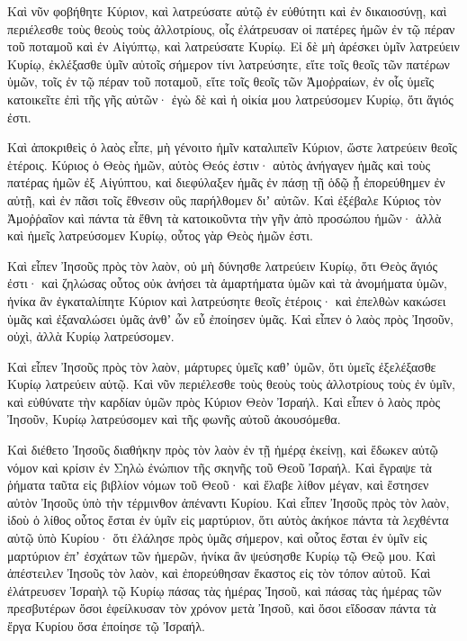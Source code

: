 {\par }{\PP {}Καὶ νῦν φοβήθητε Κύριον, καὶ λατρεύσατε αὐτῷ ἐν εὐθύτητι καὶ ἐν δικαιοσύνῃ, καὶ περιέλεσθε τοὺς θεοὺς τοὺς ἀλλοτρίους, οἷς ἐλάτρευσαν οἱ πατέρες ἡμῶν ἐν τῷ πέραν τοῦ ποταμοῦ καὶ ἐν Αἰγύπτῳ, καὶ λατρεύσατε Κυρίῳ.
Εἰ δὲ μὴ ἀρέσκει ὑμῖν λατρεύειν Κυρίῳ, ἐκλέξασθε ὑμῖν αὐτοῖς σήμερον τίνι λατρεύσητε, εἴτε τοῖς θεοῖς τῶν πατέρων ὑμῶν, τοῖς ἐν τῷ πέραν τοῦ ποταμοῦ, εἴτε τοῖς θεοῖς τῶν Ἀμοῤραίων, ἐν οἷς ὑμεῖς κατοικεῖτε ἐπὶ τῆς γῆς αὐτῶν· ἐγὼ δὲ καὶ ἡ οἰκία μου λατρεύσομεν Κυρίῳ, ὅτι ἅγιός ἐστι.
\par }{\PP {}Καὶ ἀποκριθεὶς ὁ λαὸς εἶπε, μὴ γένοιτο ἡμῖν καταλιπεῖν Κύριον, ὥστε λατρεύειν θεοῖς ἑτέροις.
Κύριος ὁ Θεὸς ἡμῶν, αὐτὸς Θεός ἐστιν· αὐτὸς ἀνήγαγεν ἡμᾶς καὶ τοὺς πατέρας ἡμῶν ἐξ Αἰγύπτου, καἰ διεφύλαξεν ἡμᾶς ἐν πάσῃ τῇ ὁδῷ ᾗ ἐπορεύθημεν ἐν αὐτῇ, καὶ ἐν πᾶσι τοῖς ἔθνεσιν οὓς παρήλθομεν διʼ αὐτῶν.
Καὶ ἐξέβαλε Κύριος τὸν Ἀμοῤῥαῖον καὶ πάντα τὰ ἔθνη τὰ κατοικοῦντα τὴν γῆν ἀπὸ προσώπου ἡμῶν· ἀλλὰ καὶ ἡμεῖς λατρεύσομεν Κυρίῳ, οὗτος γὰρ Θεὸς ἡμῶν ἐστι.
\par }{\PP {}Καὶ εἶπεν Ἰησοῦς πρὸς τὸν λαὸν, οὐ μὴ δύνησθε λατρεύειν Κυρίῳ, ὅτι Θεὸς ἅγιός ἐστι· καὶ ζηλώσας οὗτος οὐκ ἀνήσει τὰ ἁμαρτήματα ὑμῶν καὶ τὰ ἀνομήματα ὑμῶν,
ἡνίκα ἂν ἐγκαταλίπητε Κύριον καὶ λατρεύσητε θεοῖς ἑτέροις· καὶ ἐπελθὼν κακώσει ὑμᾶς καὶ ἐξαναλώσει ὑμᾶς ἀνθʼ ὧν εὖ ἐποίησεν ὑμᾶς.
Καὶ εἶπεν ὁ λαὸς πρὸς Ἰησοῦν, οὐχὶ, ἀλλὰ Κυρίῳ λατρεύσομεν.
\par }{\PP {}Καὶ εἶπεν Ἰησοῦς πρὸς τὸν λαὸν, μάρτυρες ὑμεῖς καθʼ ὑμῶν, ὅτι ὑμεῖς ἐξελέξασθε Κυρίῳ λατρεύειν αὐτῷ.
Καὶ νῦν περιέλεσθε τοὺς θεοὺς τοὺς ἀλλοτρίους τοὺς ἐν ὑμῖν, καὶ εὐθύνατε τὴν καρδίαν ὑμῶν πρὸς Κύριον Θεὸν Ἰσραήλ.
Καὶ εἶπεν ὁ λαὸς πρὸς Ἰησοῦν, Κυρίῳ λατρεύσομεν καὶ τῆς φωνῆς αὐτοῦ ἀκουσόμεθα.
\par }{\PP {}Καὶ διέθετο Ἰησοῦς διαθήκην πρὸς τὸν λαὸν ἐν τῇ ἡμέρᾳ ἐκείνῃ, καὶ ἔδωκεν αὐτῷ νόμον καὶ κρίσιν ἐν Σηλὼ ἐνώπιον τῆς σκηνῆς τοῦ Θεοῦ Ἰσραήλ.
Καὶ ἔγραψε τὰ ῥήματα ταῦτα εἰς βιβλίον νόμων τοῦ Θεοῦ· καὶ ἔλαβε λίθον μέγαν, καὶ ἔστησεν αὐτὸν Ἰησοῦς ὑπὸ τὴν τέρμινθον ἀπέναντι Κυρίου.
Καὶ εἶπεν Ἰησοῦς πρὸς τὸν λαὸν, ἰδοὺ ὁ λίθος οὗτος ἔσται ἐν ὑμῖν εἰς μαρτύριον, ὅτι αὐτὸς ἀκήκοε πάντα τὰ λεχθέντα αὐτῷ ὑπὸ Κυρίου· ὅτι ἐλάλησε πρὸς ὑμᾶς σήμερον, καὶ οὗτος ἔσται ἐν ὑμῖν εἰς μαρτύριον ἐπʼ ἐσχάτων τῶν ἡμερῶν, ἡνίκα ἂν ψεύσησθε Κυρίῳ τῷ Θεῷ μου.
Καὶ ἀπέστειλεν Ἰησοῦς τὸν λαὸν, καὶ ἐπορεύθησαν ἕκαστος εἰς τὸν τόπον αὐτοῦ.
Καὶ ἐλάτρευσεν Ἰσραὴλ τῷ Κυρίῳ πάσας τὰς ἡμέρας Ἰησοῦ, καὶ πάσας τὰς ἡμέρας τῶν πρεσβυτέρων ὅσοι ἐφείλκυσαν τὸν χρόνον μετὰ Ἰησοῦ, καὶ ὅσοι εἴδοσαν πάντα τὰ ἔργα Κυρίου ὅσα ἐποίησε τῷ Ἰσραήλ.
}
